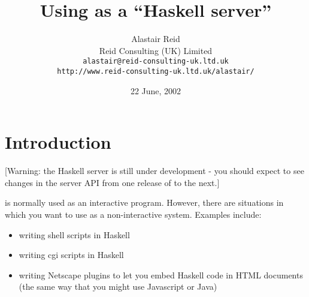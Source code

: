 \newcommand{\HeyPaul}[1]{\par{{\bf Hey Paul:} \sl #1}\par}
\newcommand{\ToDo}[1]{\par{{\bf ToDo:} \sl #1}\par}

\newenvironment{outline}{%
  \medbreak
  \noindent
  {\bf Outline: }
  \begingroup
    \nobreak
    \sl
}{%
  \endgroup
  \nobreak
  {\bf End outline.}
  \medbreak
}

%



\title{%
  Using \Hugs{} as a ``Haskell server''
}

\author{Alastair Reid\\
Reid Consulting (UK) Limited\\
{\tt alastair@reid-consulting-uk.ltd.uk}\\
{\tt http://www.reid-consulting-uk.ltd.uk/alastair/}}

\date{22 June, 2002}

\maketitle

\section{Introduction}\label{introduction}

[Warning: the Haskell server is still under development - you should
 expect to see changes in the server API from one release of \Hugs{} to
 the next.]

\Hugs{} is normally used as an interactive program.  However, there are
situations in which you want to use \Hugs{} as a non-interactive system.
Examples include:

\begin{itemize}
\item
 writing shell scripts in Haskell
\item
 writing cgi scripts in Haskell
\item
 writing Netscape plugins to let you embed Haskell code in HTML documents
 (the same way that you might use Javascript or Java)
\end{itemize}

